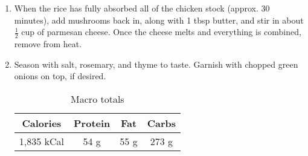 \documentclass{report}
\begin{document}
\begin{multicols}{2}
\begin{enumerate}
\item When the rice has fully absorbed all of the chicken stock (approx. 30 minutes), add mushrooms back in, along with 1 tbsp butter, and stir in about $\frac{1}{2}$ cup of parmesan cheese. Once the cheese melts and everything is combined, remove from heat. 
\item Season with salt, rosemary, and thyme to taste. Garnish with chopped green onions on top, if desired. 


\begin{table}[H]
  \begin{center}
    \caption{Macro totals}
    \label{tab:table1}
    \begin{tabular}{c|c|c|c} %
      \textbf{Calories} & \textbf{Protein} & \textbf{Fat} & \textbf{Carbs}\\
      \hline
      1,835 kCal & 54 g & 55 g & 273 g\\
    \end{tabular}
  \end{center}
\end{table}
 
\end{enumerate}
\end{multicols}




\end{document}
